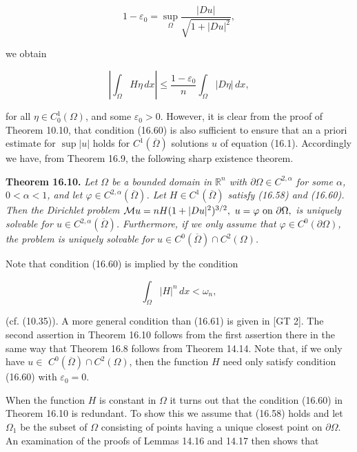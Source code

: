 \[
1-\varepsilon_0=\sup_\Omega \frac{|Du|}{\sqrt{1+|Du|^2}},
\]

\noindent we obtain

\begin{equation*}\tag{16.60}
\left|\int_\Omega H\eta\,dx\right|\leq \frac{1-\varepsilon_0}{n}\int_\Omega |D\eta|\,dx,
\end{equation*}

\noindent for all $\eta \in C_0^1(\Omega)$, and some $\varepsilon_0>0$. However, it is clear from the proof of Theorem
10.10, that condition (16.60) is also sufficient to ensure that an a priori estimate for
 $\sup |u|$ holds for $C^1(\overline{\Omega})$ solutions $u$ of equation (16.1). Accordingly we have, from
Theorem 16.9, the following sharp existence theorem.

\medskip

\noindent\textbf{Theorem 16.10.} \textit{Let $\Omega$ be a bounded domain in $\mathbb{R}^n$ with $\partial\Omega \in C^{2,\alpha}$ for some $\alpha$,
$0<\alpha<1$, and let $\varphi \in C^{2,\alpha}(\overline{\Omega})$. Let $H \in C^1(\overline{\Omega})$ satisfy (16.58) and (16.60). Then
the Dirichlet problem $\mathcal{M} u = nH(1+|Du|^2)^{3/2},\ u=\varphi\ \text{on }\partial\Omega,$ is uniquely solvable
for $u \in C^{2,\alpha}(\overline{\Omega})$. Furthermore, if we only assume that $\varphi \in C^0(\partial\Omega)$, the problem is
uniquely solvable for $u \in C^0(\overline{\Omega}) \cap C^2(\Omega)$.}

\medskip

Note that condition (16.60) is implied by the condition

\begin{equation*}\tag{16.61}
\int_\Omega |H|^n\,dx < \omega_n,
\end{equation*}



(cf. (10.35)). A more general condition than (16.61) is given in [GT 2]. The second
assertion in Theorem 16.10 follows from the first assertion there in the same way
that Theorem 16.8 follows from Theorem 14.14. Note that, if we only have $u \in$
$C^0(\overline{\Omega}) \cap C^2(\Omega)$, then the function $H$ need only satisfy condition (16.60) with
$\varepsilon_0 = 0$.

    When the function $H$ is constant in $\Omega$ it turns out that the condition (16.60)
in Theorem 16.10 is redundant. To show this we assume that (16.58) holds and let
$\Omega_1$ be the subset of $\Omega$ consisting of points having a unique closest point on $\partial\Omega$.
An examination of the proofs of Lemmas 14.16 and 14.17 then shows that

